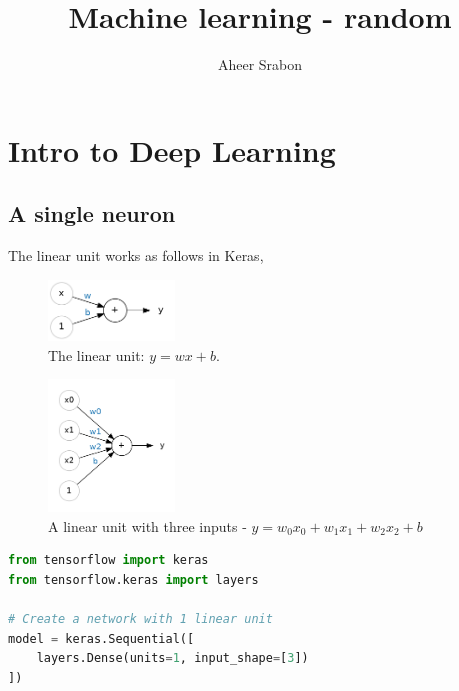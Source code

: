 

\title{Machine learning - random}
\author{Aheer Srabon}
\date{}


\maketitle

\section{Intro to Deep Learning}
\subsection{A single neuron}
\noindent The linear unit works as follows in Keras,

\begin{figure}[htp]
	\centering
	\includegraphics[width=0.3\textwidth]{../assets/machine_learning_random/the_linear_unit.png}
	\caption{The linear unit: $ y = wx + b $.}
\end{figure}

\begin{figure}[htp]
	\centering
	\includegraphics[width=0.3\textwidth]{../assets/machine_learning_random/a_linear_unit_with_multiple_inputs.png}
	\caption{A linear unit with three inputs - $ y = w_0 x_0 + w_1 x_1 + w_2 x_2 + b $}
\end{figure}

\pagebreak

\begin{lstlisting}[language=Python]
from tensorflow import keras
from tensorflow.keras import layers

# Create a network with 1 linear unit
model = keras.Sequential([
	layers.Dense(units=1, input_shape=[3])
])
\end{lstlisting}

